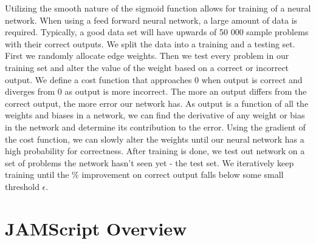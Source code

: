 \documentclass{article}
\begin{document}
\begin{multicols}{2}
	Utilizing the smooth nature of the sigmoid function allows for training of a neural network. When using a feed forward neural network, a large amount of data is required. Typically, a good data set will have upwards of 50 000 sample problems with their correct outputs. We split the data into a training and a testing set. First we randomly allocate edge weights. Then we test every problem in our training set and alter the value of the weight based on a correct or incorrect output.  We define a cost function that approaches 0 when output is correct and diverges from 0 as output is more incorrect. The more an output differs from the correct output, the more error our network has. As output is a function of all the weights and biases in a network, we can find the derivative of any weight or bias in the network and determine its contribution to the error. Using the gradient of the cost function, we can slowly alter the weights until our neural network has a high probability for correctness. After training is done, we test out network on a set of problems the network hasn’t seen yet - the test set. We iteratively keep training until the \% improvement on correct output falls below some small threshold \(\epsilon\). 

\end{multicols}

\section{JAMScript Overview}
\end{document}
